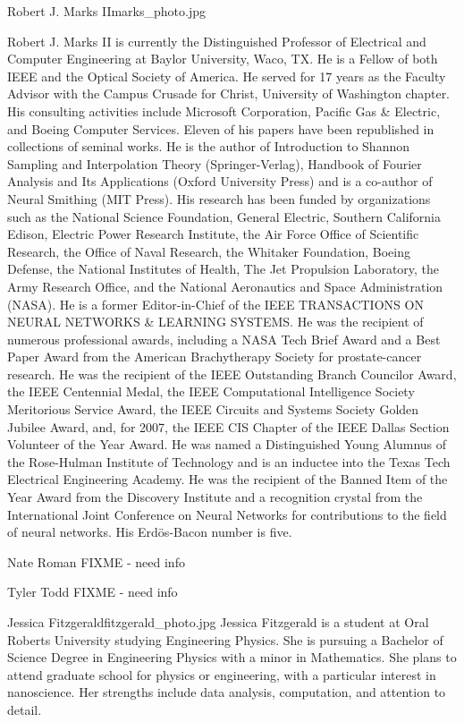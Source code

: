 \begin{authorbio}{Robert J. Marks II}{marks_photo.jpg}

Robert J. Marks II is currently the Distinguished Professor of Electrical and Computer Engineering 
at Baylor University, Waco, TX. He is a Fellow of both IEEE and the Optical Society
of America. He served for 17 years as the Faculty Advisor with the Campus Crusade for Christ,
University of Washington chapter. His consulting activities include Microsoft Corporation, Pacific
Gas \& Electric, and Boeing Computer Services. Eleven of his papers have been republished in collections 
of seminal works. He is the author of Introduction to Shannon Sampling and Interpolation
Theory (Springer-Verlag), Handbook of Fourier Analysis and Its Applications (Oxford University
Press) and is a co-author of Neural Smithing (MIT Press). His research has been funded by organizations 
such as the National Science Foundation, General Electric, Southern California Edison,
Electric Power Research Institute, the Air Force Office of Scientific Research, the Office of Naval
Research, the Whitaker Foundation, Boeing Defense, the National Institutes of Health, The Jet
Propulsion Laboratory, the Army Research Office, and the National Aeronautics and Space Administration 
(NASA). He is a former Editor-in-Chief of the IEEE TRANSACTIONS ON NEURAL
NETWORKS \& LEARNING SYSTEMS. He was the recipient of numerous professional awards,
including a NASA Tech Brief Award and a Best Paper Award from the American Brachytherapy
Society for prostate-cancer research. He was the recipient of the IEEE Outstanding Branch Councilor 
Award, the IEEE Centennial Medal, the IEEE Computational Intelligence Society Meritorious
Service Award, the IEEE Circuits and Systems Society Golden Jubilee Award, and, for 2007, the
IEEE CIS Chapter of the IEEE Dallas Section Volunteer of the Year Award. He was named a
Distinguished Young Alumnus of the Rose-Hulman Institute of Technology and is an inductee into
the Texas Tech Electrical Engineering Academy. He was the recipient of the Banned Item of the
Year Award from the Discovery Institute and a recognition crystal from the International Joint
Conference on Neural Networks for contributions to the field of neural networks. His Erd\"{o}s-Bacon
number is five.
\end{authorbio}

\begin{authorbio}{Nate Roman}{}
FIXME - need info
\end{authorbio}

\begin{authorbio}{Tyler Todd}{}
FIXME - need info
\end{authorbio}

\begin{authorbio}{Jessica Fitzgerald}{fitzgerald_photo.jpg}
Jessica Fitzgerald is a student at Oral Roberts University studying Engineering Physics.  She is pursuing a Bachelor of Science Degree in Engineering Physics with a minor in Mathematics. She plans to attend graduate school for physics or engineering, with a particular interest in nanoscience. Her strengths include data analysis, computation, and attention to detail.
\end{authorbio}
